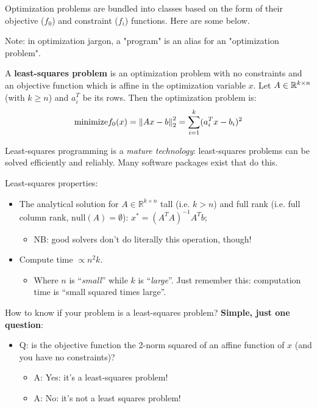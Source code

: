 Optimization problems are bundled into classes based on the form of their objective ($f_0$) and constraint ($f_i$)
functions. Here are some below.

\begin{Fact}
  Note: in optimization jargon, a "program" is an alias for an "optimization problem".
\end{Fact}


\begin{Definition}
  A \textbf{least-squares problem} is an optimization problem with no constraints and an objective
  function which is affine in the optimization variable $x$. Let $A\in\mathbb R^{k\times n}$ (with $k\ge n$) and $a_i^T$ be
  its rows. Then the optimization problem is:
  \begin{equation*}
    \text{minimize} f_0(x) = \left\|Ax-b\right\|_{2}^2 = \sum_{i=1}^k (a_i^Tx-b_i)^2
  \end{equation*}
\end{Definition}

Least-squares programming is a \textit{mature technology}: least-squares problems can be solved efficiently and
reliably. Many software packages exist that do this.

\begin{Fact}
  Least-squares properties:
  \begin{itemize}
  \item The analytical solution for $A\in\mathbb R^{k\times n}$ tall (i.e. $k>n$) and full rank (i.e. full column rank,
    $\text{null}(A)=\emptyset$): $x^*=(A^TA)^{-1}A^Tb$;
    \begin{itemize}
    \item NB: good solvers don't do literally this operation, though!
    \end{itemize}
  \item Compute time $\propto n^2k$.
    \begin{itemize}
    \item Where $n$ is ``\textit{small}'' while $k$ is ``\textit{large}''. Just remember this: computation time is
      ``small squared times large''.
    \end{itemize}
  \end{itemize}
\end{Fact}

How to know if your problem is a least-squares problem? \textbf{Simple, just one question}:

\begin{itemize}
\item Q: is the objective function the 2-norm squared of an affine function of $x$ (and you have no constraints)?
  \begin{itemize}
  \item A: Yes: it's a least-squares problem!
  \item A: No: it's not a least squares problem!
  \end{itemize}
\end{itemize}

